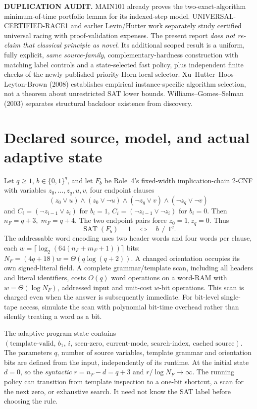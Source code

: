 \documentclass[11pt]{article}
\begin{document}
\par\noindent\textbf{DUPLICATION AUDIT.} MAIN101 already proves the
two-exact-algorithm minimum-of-time portfolio lemma for its indexed-step
model. UNIVERSAL-CERTIFIED-RACE1 and earlier Levin/Hutter work separately
study certified universal racing with proof-validation expenses.
The present report \emph{does not re-claim that classical principle as novel}.
Its additional scoped result is a uniform, fully explicit, \emph{same
source-family}, complementary-hardness construction with matching label
controls and a state-selected fast policy, plus independent finite checks
of the newly published priority-Horn local selector. Xu--Hutter--Hoos--Leyton-Brown
(2008) establishes empirical instance-specific algorithm selection, not
a theorem about unrestricted SAT lower bounds. Williams--Gomes--Selman
(2003) separates structural backdoor existence from discovery.

\section{Declared source, model, and actual adaptive state}
Let $q\ge1$, $b\in\{0,1\}^q$, and let $F_b$ be Role~4's
fixed-width implication-chain 2-CNF with variables
$z_0,\dots,z_q,u,v$, four endpoint clauses
\[
(z_0\vee u)\wedge(z_0\vee\neg u)\wedge
(\neg z_q\vee v)\wedge(\neg z_q\vee\neg v)
\]
and $C_i=(\neg z_{i-1}\vee z_i)$ for $b_i=1$,
$C_i=(\neg z_{i-1}\vee\neg z_i)$ for $b_i=0$.
Then $n_F=q+3,\;m_F=q+4$. The two endpoint pairs force
$z_0=1,z_q=0$. Thus
\[
\operatorname{SAT}(F_b)=1\quad\Longleftrightarrow\quad b\ne1^q.
\tag{1}
\]
The addressable word encoding uses two header words and four words per
clause, each $w=\lceil\log_2(64(n_F+m_F+1))\rceil$ bits:
$N_F=(4q+18)w=\Theta(q\log(q+2))$.
A changed orientation occupies its own signed-literal field.
A complete grammar/template scan, including all headers and literal
identifiers, costs $O(q)$ word operations on a word-RAM with
$w=\Theta(\log N_F)$, addressed input and unit-cost $w$-bit operations.
This scan is charged even when the answer is subsequently immediate.
For bit-level single-tape access, simulate the scan with polynomial
bit-time overhead rather than silently treating a word as a bit.

The adaptive program state contains
$(\text{template-valid},\,b_1,\,i,\,\text{seen-zero},\,
\text{current-mode},\,\text{search-index},\,\text{cached source})$.
The parameters $q$, number of source variables, template grammar
and orientation bits are defined from the input, independently of its
runtime. At the initial state $d=0$, so the \emph{syntactic}
$r=n_F-d=q+3$ and $r/\log N_F\to\infty$.
The running policy can transition from template inspection to a
one-bit shortcut, a scan for the next zero, or exhaustive search.
It need not know the SAT label before choosing the rule.
\end{document}
